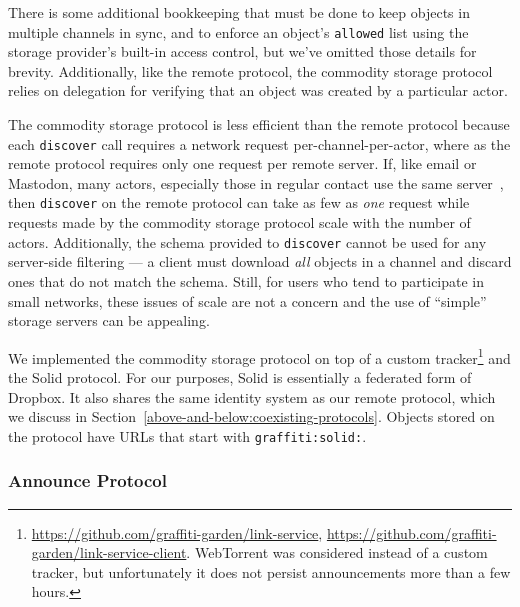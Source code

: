 There is some additional bookkeeping that must be done to
keep objects in multiple channels in sync, and to enforce an object's
\texttt{allowed} list using the storage provider's built-in access control,
but we've omitted those details for brevity.
Additionally, like the remote protocol, the commodity storage protocol
relies on delegation for verifying that an object was created by a particular actor.

The commodity storage protocol is less efficient than the remote protocol because each
\texttt{discover} call requires a network request per-channel-per-actor,
where as the remote protocol requires only one request per remote server.
If, like email or Mastodon, many actors, especially those in regular contact
use the same server~\cite{mastodonchallenges},
then \texttt{discover} on the remote protocol can take as
few as \emph{one} request while requests made by
the commodity storage protocol scale with the number of actors.
Additionally, the schema provided to \texttt{discover} cannot be used for any
server-side filtering --- a client must download \emph{all} objects in a channel
and discard ones that do not match the schema.
Still, for users who tend to participate in small networks, these issues
of scale are not a concern and the use of ``simple'' storage servers can be appealing.

We implemented the commodity storage protocol
on top of a custom tracker\footnote{
    \url{https://github.com/graffiti-garden/link-service},
    \url{https://github.com/graffiti-garden/link-service-client}.
    WebTorrent was considered instead of a custom tracker,
    but unfortunately it does not persist announcements more than a few hours.
} and the Solid protocol.
For our purposes, Solid is essentially a federated form of Dropbox.
It also shares the same identity system as our remote protocol,
which we discuss in Section~\ref{above-and-below:coexisting-protocols}.
Objects stored on the protocol have URLs that start with \texttt{graffiti:solid:}.

\subsubsection{Announce Protocol}
\label{above-and-below:announce-protocol}

